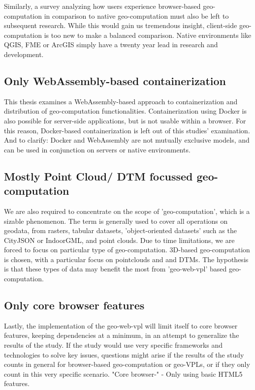 
Similarly, a survey analyzing how users experience browser-based geo-computation in comparison to native geo-computation must also be left to subsequent research. While this would gain us tremendous insight, client-side geo-computation is too new to make a balanced comparison. Native environments like QGIS, FME or ArcGIS simply have a twenty year lead in research and development. 


\subsection*{Only WebAssembly-based containerization}
This thesis examines a WebAssembly-based approach to containerization and distribution of geo-computation functionalities. 
Containerization using Docker is also possible for server-side applications, but is not usable within a browser. 
For this reason, Docker-based containerization is left out of this studies' examination. 
And to clarify: Docker and WebAssembly are not mutually exclusive models, and can be used in conjunction on servers or native environments. 

\subsection*{Mostly Point Cloud/ DTM focussed geo-computation}
We are also required to concentrate on the scope of 'geo-computation', which is a sizable phenomenon.
The term is generally used to cover all operations on geodata, from rasters, tabular datasets, 'object-oriented datasets' such as the CityJSON or IndoorGML, and point clouds. 
Due to time limitations, we are forced to focus on particular type of geo-computation.
3D-based geo-computation is chosen, with a particular focus on pointclouds and and DTMs. 
The hypothesis is that these types of data may benefit the most from 'geo-web-vpl' based geo-computation.

\subsection*{Only core browser features}
Lastly, the implementation of the geo-web-vpl will limit itself to core browser features, keeping dependencies at a minimum, in an attempt to generalize the results of the study.
If the study would use very specific frameworks and technologies to solve key issues, questions might arise if the results of the study counts in general for browser-based geo-computation or geo-VPLs, or if they only count in this very specific scenario. 
"Core browser-"
- Only using basic HTML5 features.

